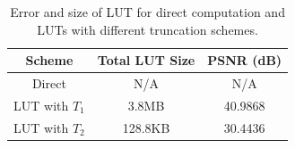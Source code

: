 \documentclass[12pt]{amsart}
\theoremstyle{definition}
\theoremstyle{remark}
\numberwithin{thm}{section}
\begin{document}
\begin{center}
\begin{table}[h]
	 
    \begin{tabular}{ | c | c| c |}
    \hline
    Scheme & Total LUT Size & PSNR (dB) \\ \hline
    Direct & N/A & N/A  \\ \hline
    LUT with $T_1$ & 3.8MB & 40.9868 \\ \hline
    LUT with $T_2$ & 128.8KB & 30.4436 \\ \hline   
    \end{tabular}
    \bigskip
    
    \caption{Error and size of LUT for direct computation and LUTs with different truncation schemes.}
     \label{tbl:high_pass}
\end{table}
\end{center}
\end{document}

